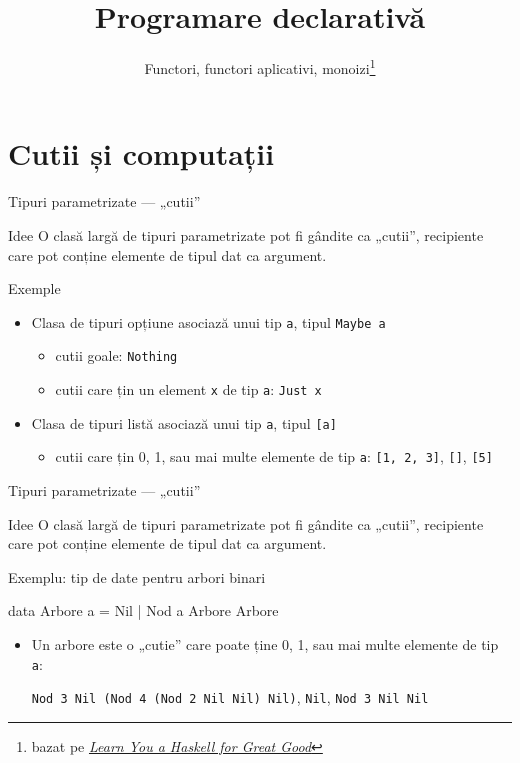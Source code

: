 \documentclass[xcolor=pdftex,romanian,colorlinks]{beamer}
\title[PD---Meta-Programare]{Programare declarativă}
\subtitle{Functori, functori aplicativi, monoizi\thanks{bazat pe \emph{\href{http://learnyouahaskell.com/functors-applicative-functors-and-monoids}{Learn You a Haskell for Great Good}}}}
\begin{document}
\begin{frame}
  \titlepage
\end{frame}

\section{Cutii și computații}

\begin{frame}[fragile]{Tipuri parametrizate --- „cutii”}
\begin{block}{Idee}
O clasă largă de tipuri parametrizate pot fi gândite ca „cutii”, recipiente care pot conține elemente de tipul dat ca argument.
\end{block}
\vfill
\begin{block}{Exemple}
\begin{itemize}
\item Clasa de tipuri opțiune asociază unui tip \lstinline$a$, tipul \lstinline$Maybe a$
\begin{itemize}
\item cutii goale: \lstinline$Nothing$
\item cutii care țin un element \lstinline$x$ de tip \lstinline$a$: \lstinline$Just x$
\end{itemize}
\item Clasa de tipuri listă asociază unui tip \lstinline$a$, tipul \lstinline$[a]$
\begin{itemize}
\item cutii care țin 0, 1, sau mai multe elemente de tip \lstinline$a$: \lstinline$[1, 2, 3]$, \lstinline$[]$, \lstinline$[5]$
\end{itemize}
\end{itemize}
\end{block}
\end{frame}


\begin{frame}[fragile]{Tipuri parametrizate --- „cutii”}
\begin{block}{Idee}
O clasă largă de tipuri parametrizate pot fi gândite ca „cutii”, recipiente care pot conține elemente de tipul dat ca argument.
\end{block}
\vfill
\begin{block}{Exemplu: tip de date pentru arbori binari}
\begin{asciihs}
data Arbore a = Nil
              | Nod a Arbore Arbore
\end{asciihs}
\begin{itemize}
\item Un arbore este o „cutie” care poate ține 0, 1, sau mai multe elemente de tip \lstinline$a$:

\lstinline$Nod 3 Nil (Nod 4 (Nod 2 Nil Nil) Nil)$, \lstinline$Nil$, \lstinline$Nod 3 Nil Nil$
\end{itemize}
\end{block}
\end{frame}
\end{document}
